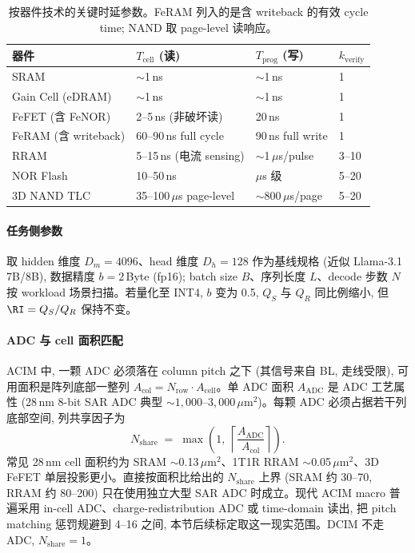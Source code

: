 \begin{table}[h!]
\centering
\small
\renewcommand{\arraystretch}{1.2}
\begin{tabular}{@{} l l l l @{}}
\toprule
\textbf{器件} & \textbf{$T_{\mathrm{cell}}$ (读)} & \textbf{$T_{\mathrm{prog}}$ (写)} & \textbf{$k_{\mathrm{verify}}$} \\
\midrule
SRAM & $\sim$1\,ns & $\sim$1\,ns & 1 \\
Gain Cell (eDRAM) & $\sim$1\,ns & $\sim$1\,ns & 1 \\
FeFET (含 FeNOR) & 2--5\,ns (非破坏读) & 20\,ns & 1 \\
FeRAM (含 writeback) & 60--90\,ns full cycle & 90\,ns full write & 1 \\
RRAM & 5--15\,ns (电流 sensing) & $\sim$1\,$\mu$s/pulse & 3--10 \\
NOR Flash & 10--50\,ns & $\mu$s 级 & 5--20 \\
3D NAND TLC & 35--100\,$\mu$s page-level & $\sim$800\,$\mu$s/page & 5--20 \\
\bottomrule
\end{tabular}
\caption{按器件技术的关键时延参数。FeRAM 列入的是含 writeback 的有效 cycle time; NAND 取 page-level 读响应。}
\label{tab:cell_params}
\end{table}

\paragraph{任务侧参数}
取 hidden 维度 $D_m = 4096$、head 维度 $D_h = 128$ 作为基线规格 (近似 Llama-3.1 7B/8B), 数据精度 $b = 2$\,Byte (fp16); batch size $B$、序列长度 $L$、decode 步数 $N$ 按 workload 场景扫描。若量化至 INT4, $b$ 变为 0.5, $Q_S$ 与 $Q_R$ 同比例缩小, 但 $\RI = Q_S/Q_R$ 保持不变。

\paragraph{ADC 与 cell 面积匹配}
\label{para:pitch_matching}
ACIM 中, 一颗 ADC 必须落在 column pitch 之下 (其信号来自 BL, 走线受限), 可用面积是阵列底部一整列 $A_{\mathrm{col}} = N_{\mathrm{row}} \cdot A_{\mathrm{cell}}$。单 ADC 面积 $A_{\mathrm{ADC}}$ 是 ADC 工艺属性 (28\,nm 8-bit SAR ADC 典型 $\sim 1{,}000$--$3{,}000\,\mu\mathrm{m}^2$)。每颗 ADC 必须占据若干列底部空间, 列共享因子为
\begin{equation}
N_{\mathrm{share}} \;=\; \max\!\left(1,\ \left\lceil \frac{A_{\mathrm{ADC}}}{A_{\mathrm{col}}} \right\rceil\right).
\label{eq:Nshare}
\end{equation}
常见 28\,nm cell 面积约为 SRAM $\sim$0.13\,$\mu$m$^2$、1T1R RRAM $\sim$0.05\,$\mu$m$^2$、3D FeFET 单层投影更小。直接按面积比给出的 $N_{\mathrm{share}}$ 上界 (SRAM 约 30--70, RRAM 约 80--200) 只在使用独立大型 SAR ADC 时成立。现代 ACIM macro 普遍采用 in-cell ADC、charge-redistribution ADC 或 time-domain 读出, 把 pitch matching 惩罚规避到 4--16 之间, 本节后续标定取这一现实范围。DCIM 不走 ADC, $N_{\mathrm{share}} = 1$。


